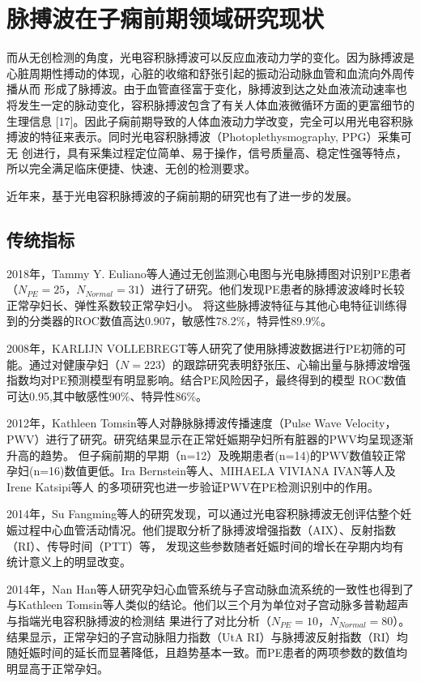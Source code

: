 \section{脉搏波在子痫前期领域研究现状}

而从无创检测的角度，光电容积脉搏波可以反应血液动力学的变化。因为脉搏波是心脏周期性搏动的体现，心脏的收缩和舒张引起的振动沿动脉血管和血流向外周传播从而
形成了脉搏波。由于血管直径富于变化，脉搏波到达之处血液流动速率也将发生一定的脉动变化，容积脉搏波包含了有关人体血液微循环方面的更富细节的生理信息
[17]。因此子痫前期导致的人体血液动力学改变，完全可以用光电容积脉搏波的特征来表示。同时光电容积脉搏波（Photoplethysmography, PPG）采集可无
创进行，具有采集过程定位简单、易于操作，信号质量高、稳定性强等特点，所以完全满足临床便捷、快速、无创的检测要求。

近年来，基于光电容积脉搏波的子痫前期的研究也有了进一步的发展。
\subsection{传统指标}
2018年，Tammy Y. Euliano等人\cite{Euliano2018}通过无创监测心电图与光电脉搏图对识别PE患者（$N_{PE}=25$，$N_{Normal}=31$）进行了研究。他们发现PE患者的脉搏波波峰时长较正常孕妇长、弹性系数较正常孕妇小。
将这些脉搏波特征与其他心电特征训练得到的分类器的ROC数值高达0.907，敏感性78.2\%，特异性89.9\%。

2008年，KARLIJN VOLLEBREGT等人\cite{KARLIJN2008}研究了使用脉搏波数据进行PE初筛的可能。通过对健康孕妇（$N=223$）的跟踪研究表明舒张压、心输出量与脉搏波增强指数均对PE预测模型有明显影响。结合PE风险因子，最终得到的模型
ROC数值可达0.95,其中敏感性90\%、特异性86\%。

2012年，Kathleen Tomsin等人\cite{Tomsin2012}对静脉脉搏波传播速度（Pulse Wave Velocity，PWV）进行了研究。研究结果显示在正常妊娠期孕妇所有脏器的PWV均呈现逐渐升高的趋势。
但子痫前期的早期（n=12）及晚期患者(n=14)的PWV数值较正常孕妇(n=16)数值更低。Ira Bernstein等人\cite{Ira2014}、MIHAELA VIVIANA IVAN等人\cite{VivianaIvan2018}及Irene Katsipi等人\cite{Katsipi2014}
的多项研究也进一步验证PWV在PE检测识别中的作用。

2014年，Su Fangming等人\cite{Su2014}的研究发现，可以通过光电容积脉搏波无创评估整个妊娠过程中心血管活动情况。他们提取分析了脉搏波增强指数（AIX）、反射指数（RI）、传导时间（PTT）等，
发现这些参数随者妊娠时间的增长在孕期内均有统计意义上的明显改变。

2014年，Nan Han等人\cite{Han2014}研究孕妇心血管系统与子宫动脉血流系统的一致性也得到了与Kathleen Tomsin等人\cite{Tomsin2012}类似的结论。他们以三个月为单位对子宫动脉多普勒超声与指端光电容积脉搏波的检测结
果进行了对比分析（$N_{PE}=10$，$N_{Normal}=80$）。结果显示，正常孕妇的子宫动脉阻力指数（UtA RI）与脉搏波反射指数（RI）均随妊娠时间的延长而显著降低，且趋势基本一致。而PE患者的两项参数的数值均明显高于正常孕妇。

